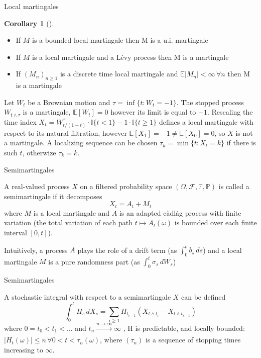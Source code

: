 \documentclass{beamer}%
\theoremstyle{definition}
\newtheorem{mycoll}[theorem]{Corollary}
\newcommand{\E}{\mathbb{E}}
\renewcommand{\P}{\mathbb{P}}
\newcommand{\F}{\mathcal{F}}
\begin{document}
\begin{frame}{Local martingales}
    \begin{mycoll}[]
        \begin{itemize}
           \item If $M$ is a bounded local martingale then M is a u.i. martingale
           \item If $M$ is a local martingale and a Lévy process then M is a martingale
           \item If $(M_n)_{n \geq 1}$ is a discrete time local martingale and $\E|M_n| < \infty \, \forall n$ then M is a martingale
        \end{itemize}
    \end{mycoll}
    \begin{example}
        Let $W_t$ be a Brownian motion and $\tau = \inf \{t:W_t = -1\}$. The stopped process $W_{t \wedge \tau}$ is a martingale, $\E[W_t] = 0$ however its limit is equal to $-1$. Rescaling the time index $X_t = W^\tau _{t/(1-t)} \cdot \mathbb{I}\{t < 1\} - 1 \cdot \mathbb{I} \{t \geq 1\}$ defines a local martingale with respect to its natural filtration, however $\E[X_1] = -1 \neq \E[X_0] = 0$, so $X$ is not a martingale. A localizing sequence can be chosen $\tau_k = \min\{t: X_t = k\}$ if there is such $t$, otherwize $\tau_k = k$.
    \end{example}
\end{frame}
\begin{frame}{Semimartingales}
    \begin{definition}
        A real-valued process $X$ on a filtered probability space $(\Omega, \F, \mathbb{F}, \P)$ is called a semimartingale if it decomposes
        \begin{equation*}
            X_t = A_t + M_t
        \end{equation*}
        where $M$ is a local martingale and $A$ is an adapted càdlàg process with finite variation (the total variation of each path $t \longmapsto A_t(\omega)$ is bounded over each finite interval $[0, t]$).
    \end{definition}
    Intuitively, a process $A$ plays the role of a drift term (as $\int_0^t b_s\,ds$) and a local martingale $M$ is a pure randomness part (as $\int_0^t \sigma_s \, dW_s$)
\end{frame}
\begin{frame}{Semimartingales}
    \begin{definition}
        A stochastic integral with respect to a semimartingale $X$ can be defined 
        \begin{equation*}
            \int_{0}^t H_s \, dX_s = \sum_{i \geq 1} H_{t_{i-1}}(X_{t \wedge t_i} - X_{t \wedge t_{i-1}})
        \end{equation*}
        where $0 = t_0 < t_1< \dots $ and $t_n \xrightarrow[]{n \to \infty} \infty$ , H is predictable, and locally bounded: $|H_t(\omega)| \leq n \, \forall 0 < t< \tau_n(\omega)$, where $(\tau_n)$ is a sequence of stopping times increasing to $\infty$.
    \end{definition}
\end{frame}
\end{document}
